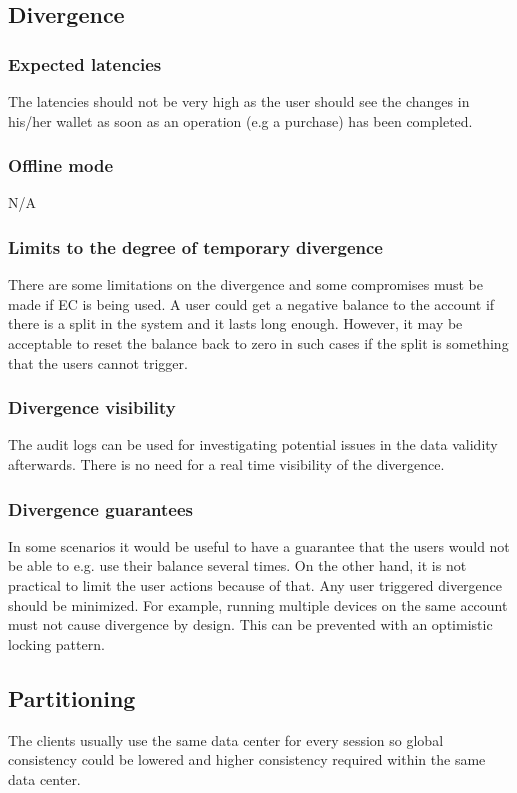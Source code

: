 \documentclass[11pt,a4paper]{report}
\begin{document}
\subsection{Divergence}
\subsubsection{Expected latencies}
The latencies should not be very high as the user should see the changes in his/her wallet as soon as an operation (e.g a purchase) has been completed.

\subsubsection{Offline mode}
N/A

\subsubsection{Limits to the degree of temporary divergence}
There are some limitations on the divergence and some compromises must be made if EC is being used. A user could get a negative balance to the account if there is a split in the system and it lasts long enough. However, it may be acceptable to reset the balance back to zero in such cases if the split is something that the users cannot trigger.

\subsubsection{Divergence visibility}
The audit logs can be used for investigating potential issues in the data validity afterwards. There is no need for a real time visibility of the divergence.

\subsubsection{Divergence guarantees}
In some scenarios it would be useful to have a guarantee that the users would not be able to e.g. use their balance several times. On the other hand, it is not practical to limit the user actions because of that.
Any user triggered divergence should be minimized. For example, running multiple devices on the same account must not cause divergence by design. This can be prevented with an optimistic locking pattern.

\subsection{Partitioning}
The clients usually use the same data center for every session so global consistency could be lowered and higher consistency required within the same data center.
\end{document}

